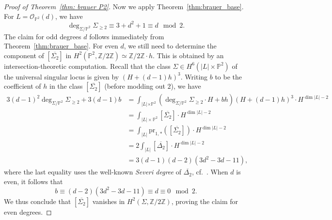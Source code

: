 \documentclass[11pt]{amsart}
\theoremstyle{plain}
\theoremstyle{definition}
\theoremstyle{remark}
\begin{document}
\begin{proof}[Proof of Theorem~\ref{thm: brauer P2}]
    Now we apply Theorem~\ref{thm:brauer_base}. For $L = \mathcal{O}_{\mathbb P^2}(d)$, we have
    \[
    \deg_{\Sigma/\mathbb P^2} \Sigma_{\geq 2} \equiv 3 + d^2 + 1 \equiv d \mod 2.
    \]
    The claim for odd degrees $d$ follows immediately from Theorem~\ref{thm:brauer_base}. For even $d$, we still need to determine the component of $[\overline{\Sigma_{2}}]$ in $H^2(\mathbb P^2, \mathbb Z/2 \mathbb Z) \simeq \mathbb Z/ 2\mathbb Z \cdot h$. This is obtained by an intersection-theoretic computation. Recall that the class $\Sigma \in H^6(|L|\times \mathbb P^2)$ of the universal singular locus  is given by $(H+(d-1)h)^3$. Writing $b$ to be the coefficient of $h$ in the class $[\overline{\Sigma_{2}}]$ (before modding out $2$), we have
    \begin{align*}
     3(d-1)^2\deg_{\Sigma/ \mathbb P^2} \Sigma_{\geq 2} +3(d-1)b&= \int_{\mathbb |L| \times \mathbb P^2} (\deg_{\Sigma/\mathbb P^2} \Sigma_{\geq2 }\cdot H+bh)(H+(d-1)h)^3 \cdot H^{\dim|L|-2}  \\
    &= \int_{|L| \times \mathbb P^2} [\overline{\Sigma_{2}}] \cdot H^{\dim|L|-2}\\
    &= \int_{|L|} \mathrm{pr}_{1, *}([\overline{\Sigma_{2}}]) \cdot H^{\dim|L|-2} \\
    &= 2 \int_{|L|} [\overline{\Delta_{2}}] \cdot H^{\dim|L|-2} \\
    &= 3(d-1)(d-2)(3d^2 - 3d - 11),
\end{align*}
where the last equality uses the well-known \textit{Severi degree} of $\overline{\Delta_2}$, cf.~\cite{Roberts, Vainsencher}. When $d$ is even, it follows that
\[
b \equiv (d-2)(3d^2 - 3d - 11) \equiv d \equiv 0 \mod 2.
\]
We thus conclude that $[\overline{\Sigma_{2}}]$ vanishes in $H^2(\Sigma, \mathbb Z/ 2\mathbb Z)$, proving the claim for even degrees.
\end{proof}
\end{document}
